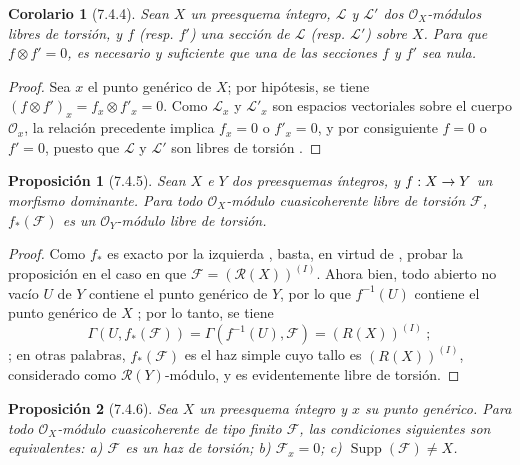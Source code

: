 \documentclass[oneside]{amsart}
\theoremstyle{ega-env-style}
\theoremstyle{ega-thm-env-style}
\newtheorem*{proposition}{Proposición}
\newtheorem*{corollary}{Corolario}
\theoremstyle{ega-defn-env-style}
\renewcommand{\to}{\mathchoice{\longrightarrow}{\rightarrow}{\rightarrow}{\rightarrow}}
\newcommand{\oldpage}[2][]{{\marginnote{\normalfont{\textbf{#1}~|~#2}}}\ignorespaces}
\let\EGAOriginalLabel\label
\renewcommand{\label}[1]{\phantomsection\EGAOriginalLabel{#1}}
\begin{document}
\begin{corollary}[7.4.4]
\label{I.7.4.4}
Sean $X$ un preesquema íntegro, $\mathscr{L}$ y $\mathscr{L}'$ dos $\mathscr{O}_X$-módulos libres de torsión, y $f$ \textup{(resp. $f'$)} una sección de $\mathscr{L}$ \textup{(resp. $\mathscr{L}'$)} sobre $X$.
Para que $f\otimes f'=0$, es necesario y suficiente que una de las secciones $f$ y $f'$ sea nula.
\end{corollary}

\begin{proof}
Sea $x$ el punto genérico de $X$; por hipótesis, se tiene $(f\otimes f')_x=f_x\otimes f'_x=0$.
Como $\mathscr{L}_x$ y $\mathscr{L}'_x$ son espacios vectoriales sobre el cuerpo $\mathscr{O}_x$, la relación precedente implica $f_x=0$ o $f'_x=0$, y por consiguiente $f=0$ o $f'=0$, puesto que $\mathscr{L}$ y $\mathscr{L}'$ son libres de torsión .
\end{proof}

\begin{proposition}[7.4.5]
\label{I.7.4.5}
Sean $X$ e $Y$ dos preesquemas íntegros, y $f:X\to Y$ un morfismo dominante.
Para todo $\mathscr{O}_X$-módulo cuasicoherente libre de torsión $\mathscr{F}$, $f_*(\mathscr{F})$ es un $\mathscr{O}_Y$-módulo libre de torsión.
\end{proposition}

\oldpage[I]{164}
\begin{proof}
Como $f_*$ es exacto por la izquierda , basta, en virtud de , probar la proposición en el caso en que $\mathscr{F}=(\mathscr{R}(X))^{(I)}$.
Ahora bien, todo abierto no vacío $U$ de $Y$ contiene el punto genérico de $Y$, por lo que $f^{-1}(U)$ contiene el punto genérico de $X$ ; por lo tanto, se tiene \[
  \Gamma(U,f_*(\mathscr{F}))
  =\Gamma(f^{-1}(U),\mathscr{F})=(R(X))^{(I)}~;
\]; en otras palabras, $f_*(\mathscr{F})$ es el haz simple cuyo tallo es $(R(X))^{(I)}$, considerado como $\mathscr{R}(Y)$-módulo, y es evidentemente libre de torsión.
\end{proof}

\begin{proposition}[7.4.6]
\label{I.7.4.6}
Sea $X$ un preesquema íntegro y $x$ su punto genérico.
Para todo $\mathscr{O}_X$-módulo cuasicoherente de tipo finito $\mathscr{F}$, las condiciones siguientes son equivalentes: \textup{a)} $\mathscr{F}$ es un haz de torsión; \textup{b)} $\mathscr{F}_x=0$; \textup{c)} $\operatorname{Supp}(\mathscr{F})\neq X$.
\end{proposition}
\end{document}
